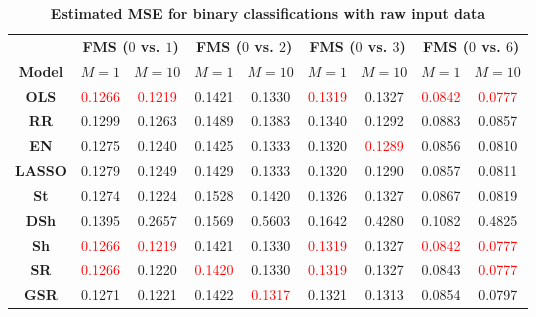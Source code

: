 \begin{table}[ht!]
\setlength{\tabcolsep}{0pt} %
\renewcommand{\arraystretch}{1}
\caption{\textbf{Estimated MSE for binary classifications with raw input data}}
\label{tab:results_Binomial_log_regression_raw_data}
\footnotesize{
\begin{tabular*}{\textwidth}{@{\extracolsep{\fill}}ccccccccc@{}}
\toprule
 & \multicolumn{2}{c}{\textbf{FMS ($0$ vs. $1$)}} & \multicolumn{2}{c}{\textbf{FMS ($0$ vs. $2$)}} & \multicolumn{2}{c}{\textbf{FMS ($0$ vs. $3$)}} & \multicolumn{2}{c}{\textbf{FMS ($0$ vs. $6$)}}\\
 \cmidrule(r){2-3} \cmidrule(r){4-5} \cmidrule(r){6-7} \cmidrule(r){8-9}
\multirow{-2}{*}{\textbf{Model}} & $M=1$ & $M=10$ & $M=1$ & $M=10$ & $M=1$ & $M=10$ & $M=1$ & $M=10$\\
\midrule
\textbf{OLS} & \textcolor{red}{0.1266} & \textcolor{red}{0.1219} & 0.1421 & 0.1330 & \textcolor{red}{0.1319} & 0.1327 & \textcolor{red}{0.0842} & \textcolor{red}{0.0777} \\
\textbf{RR} & 0.1299 & 0.1263 & 0.1489 & 0.1383 & 0.1340 & 0.1292 & 0.0883 & 0.0857 \\
\textbf{EN} & 0.1275 & 0.1240 & 0.1425 & 0.1333 & 0.1320 & \textcolor{red}{0.1289} & 0.0856 & 0.0810 \\
\textbf{LASSO} & 0.1279 & 0.1249 & 0.1429 & 0.1333 & 0.1320 & 0.1290 & 0.0857 & 0.0811 \\
\textbf{St} & 0.1274 & 0.1224 & 0.1528 & 0.1420 & 0.1326 & 0.1327 & 0.0867 & 0.0819 \\
\textbf{DSh} & 0.1395 & 0.2657 & 0.1569 & 0.5603 & 0.1642 & 0.4280 & 0.1082 & 0.4825 \\
\textbf{Sh} & \textcolor{red}{0.1266} & \textcolor{red}{0.1219} & 0.1421 & 0.1330 & \textcolor{red}{0.1319} & 0.1327 & \textcolor{red}{0.0842} & \textcolor{red}{0.0777} \\
\textbf{SR} & \textcolor{red}{0.1266} & 0.1220 & \textcolor{red}{0.1420} & 0.1330 & \textcolor{red}{0.1319} & 0.1327 & 0.0843 & \textcolor{red}{0.0777} \\
\textbf{GSR} & 0.1271 & 0.1221 & 0.1422 & \textcolor{red}{0.1317} & 0.1321 & 0.1313 & 0.0854 & 0.0797 \\
\bottomrule
\end{tabular*}
}
\end{table}
